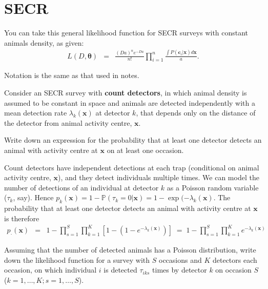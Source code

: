 \chapter{SECR\label{sec:secr_ex}}


You can take this general likelihood function for SECR surveys with constant animals density, as given:
\begin{eqnarray}
L(D,\boldsymbol{\theta})&=&\frac{(Da)^ne^{-Da}}{n!}
\prod_{i=1}^n\frac{\int P(\mathbf{c}_i|\mathbf{x})d\mathbf{x}}
{a}.
\label{eq:secrlik}
\end{eqnarray}

Notation is the same as that used in notes.

\begin{questions}

\item Consider an SECR survey with \textbf{count detectors}, in which animal density is assumed to be constant in space and animals are detected independently with a mean detection rate $\lambda_k(\mathbf{x})$ at detector $k$, that depends only on the distance of the detector from animal activity centre, $\mathbf{x}$.

\begin{parts}
\item Write down an expression for the probability that at least one detector detects an animal with activity centre at $\mathbf{x}$ on at least one occasion.

{\begin{solution}
Count detectors have independent detections at each trap (conditional on animal activity centre, $\mathbf{x}$), and they detect individuals multiple times. We can model the number of detections of an individual at detector $k$ as a Poisson random variable ($\tau_k$, say). Hence $p_k(\mathbf{x})=1-\mathbb{P}(\tau_k=0|\mathbf{x})=1-\exp(-\lambda_k(\mathbf{x})$. The probability that at least one detector detects an animal with activity centre at $\mathbf{x}$ is therefore
\begin{eqnarray}
p_\cdot(\mathbf{x})&=&1-\prod_{s=1}^S\prod_{k=1}^K\left[1-\left(1-e^{-\lambda_k(\mathbf{x})}\right)\right]
\;=\;1-\prod_{s=1}^S\prod_{k=1}^K e^{-\lambda_k(\mathbf{x})} \nonumber 
\end{eqnarray}
\end{solution}}

\item Assuming that the number of detected animals has a Poisson distribution, write down the likelihood function for a survey with $S$ occasions and $K$ detectors each occasion, on which individual $i$ is detected $\tau_{iks}$ times by detector $k$ on occasion $S$ ($k=1,\ldots,K; s=1,\ldots,S$).


\end{parts}
\end{questions}
